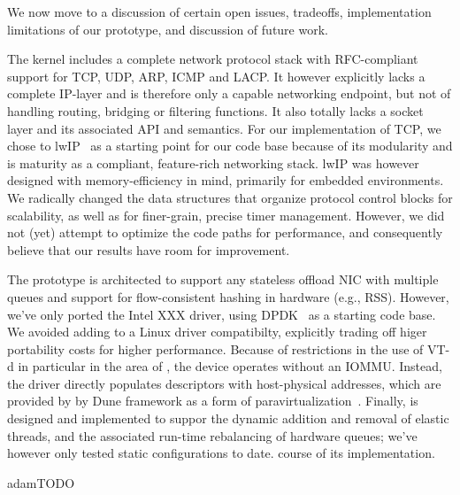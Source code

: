 We now move to a discussion of certain open issues, tradeoffs,
implementation limitations of our prototype, and discussion of future
work.

The \ix kernel includes a complete network protocol stack with
RFC-compliant support for TCP, UDP, ARP, ICMP and LACP.  It however
explicitly lacks a complete IP-layer and is therefore only a capable
networking endpoint, but not of handling routing, bridging or
filtering functions.  It also totally lacks a socket layer and its
associated API and semantics.  For our implementation of TCP, we chose
to lwIP~\cite{dunkels2001design} as a starting point for our code base because of its
modularity and is maturity as a compliant, feature-rich networking
stack.  lwIP was however designed with memory-efficiency in mind,
primarily for embedded environments.  We radically changed the data
structures that organize protocol control blocks for scalability, as
well as for finer-grain, precise timer management.  However, we did
not (yet) attempt to optimize the code paths for performance, and
consequently believe that our results have room for improvement.

The \ix prototype is architected to support any stateless offload NIC
with multiple queues and support for flow-consistent hashing in
hardware (e.g., RSS).  However, we've only ported the Intel XXX
driver, using DPDK~\cite{intel:dpdk} as a starting code base.  We
avoided adding to \ix a Linux driver compatibilty, explicitly trading
off higer portability costs for higher performance.  Because of
restrictions in the use of VT-d in particular in the area of
, the device operates without an IOMMU.  Instead, the
driver directly populates descriptors with host-physical addresses,
which are provided by by Dune framework as a form of
paravirtualization~\cite{DBLP:conf/sosp/BarhamDFHHHN03}.  Finally, \ix
is designed and implemented to suppor the dynamic addition and removal
of elastic threads, and the associated run-time rebalancing of
hardware queues; we've however only tested static configurations to
date.
course of its implementation.


adam{TODO}



